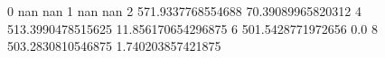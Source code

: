 0 nan nan
1 nan nan
2 571.9337768554688 70.39089965820312
4 513.3990478515625 11.856170654296875
6 501.5428771972656 0.0
8 503.2830810546875 1.740203857421875
